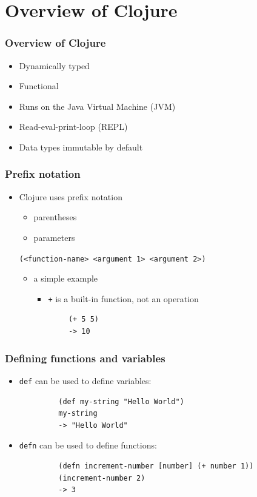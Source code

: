 \documentclass{beamer}
\begin{document}
\section{Overview of Clojure}

\begin{frame}
\frametitle{Overview of Clojure}
	\begin{itemize}
  	 \item Dynamically typed
  	 \item Functional

  	 \item Runs on the Java Virtual Machine (JVM)
  	 \item Read-eval-print-loop (REPL)
  	 \item Data types immutable by default
	 \end{itemize}
\end{frame}

\begin{frame}[fragile]
\frametitle{Prefix notation}
	\begin{itemize}
  	  \item Clojure uses prefix notation
  	  \begin{itemize}
  	 	 \item parentheses
  	 	 \item parameters
  	  \end{itemize}
		 
	  \texttt{(<function-name> <argument 1> <argument 2>)}
	  
	  \begin{itemize}
  	 	\item a simple example
  	 	\begin{itemize}
  	 	   \item \texttt{+} is a built-in function, not an operation
  	 	\end{itemize}
  	 	\begin{verbatim}		
		(+ 5 5)
		-> 10
	    \end{verbatim}
	    
  	  \end{itemize}
   \end{itemize}
\end{frame}

\begin{frame}[fragile]
\frametitle{Defining functions and variables}
	\begin{itemize}
  	  \item \texttt{def} can be used to define variables:
  	  \begin{verbatim}
		 (def my-string "Hello World")
		 my-string
		 -> "Hello World"
	  \end{verbatim}
  	  \item \texttt{defn} can be used to define functions:
  	  \begin{verbatim}
		 (defn increment-number [number] (+ number 1))
		 (increment-number 2)
		 -> 3
	  \end{verbatim}
	\end{itemize}
\end{frame}
\end{document}

